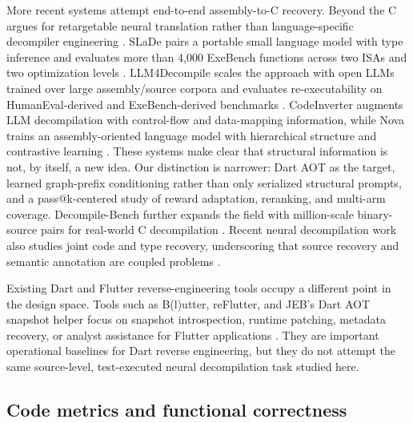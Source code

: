 \documentclass[11pt]{article}
\begin{document}
More recent systems attempt end-to-end assembly-to-C recovery. Beyond the C argues for retargetable neural translation rather than language-specific decompiler engineering \cite{hosseini2022beyondc}. SLaDe pairs a portable small language model with type inference and evaluates more than 4{,}000 ExeBench functions across two ISAs and two optimization levels \cite{armengol2023slade}. LLM4Decompile scales the approach with open LLMs trained over large assembly/source corpora and evaluates re-executability on HumanEval-derived and ExeBench-derived benchmarks \cite{tan2024llm4decompile}. CodeInverter augments LLM decompilation with control-flow and data-mapping information, while Nova trains an assembly-oriented language model with hierarchical structure and contrastive learning \cite{liu2025codeinverter,jiang2025nova}. These systems make clear that structural information is not, by itself, a new idea. Our distinction is narrower: Dart AOT as the target, learned graph-prefix conditioning rather than only serialized structural prompts, and a pass@k-centered study of reward adaptation, reranking, and multi-arm coverage. Decompile-Bench further expands the field with million-scale binary-source pairs for real-world C decompilation \cite{tan2025decompilebench}. Recent neural decompilation work also studies joint code and type recovery, underscoring that source recovery and semantic annotation are coupled problems \cite{dramko2025idioms}.

Existing Dart and Flutter reverse-engineering tools occupy a different point in the design space. Tools such as B(l)utter, reFlutter, and JEB's Dart AOT snapshot helper focus on snapshot introspection, runtime patching, metadata recovery, or analyst assistance for Flutter applications \cite{blutter,reflutter,jebdartaot}. They are important operational baselines for Dart reverse engineering, but they do not attempt the same source-level, test-executed neural decompilation task studied here.

\subsection{Code metrics and functional correctness}
\end{document}
